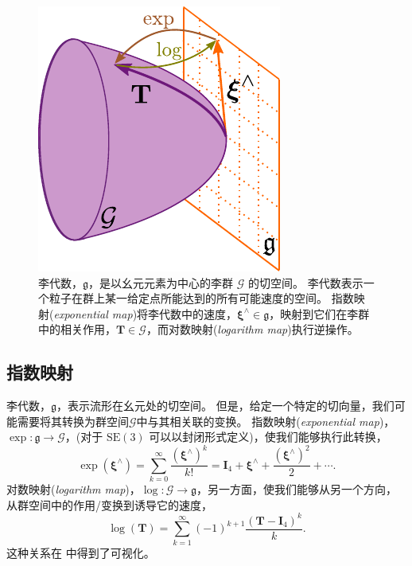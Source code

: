 \begin{figure}[t]
    \centering
    \includegraphics[width=0.7\columnwidth]{figures/lie-group-example.pdf}
    \caption{
    李代数，$\mathfrak{g}$，是以幺元元素为中心的李群 $\mathcal{G}$ 的切空间。 
    李代数表示一个粒子在群上某一给定点所能达到的所有可能速度的空间。 
    指数映射(\textit{exponential map})将李代数中的速度，$\boldsymbol{\xi}^\wedge \in \mathfrak{g}$，映射到它们在李群中的相关作用，$\mathbf{T} \in \mathcal{G}$，而对数映射(\textit{logarithm map})执行逆操作。}
    \label{fig:lie_algebra}
\end{figure}

\subsection{指数映射}

李代数，$\mathfrak{g}$，表示流形在幺元处的切空间。 
但是，给定一个特定的切向量，我们可能需要将其转换为群空间$\mathcal{G}$中与其相关联的变换。 
指数映射(\textit{exponential map})， $\operatorname{exp} : \mathfrak{g} \rightarrow \mathcal{G}$，(对于 $\mathrm{SE}(3)$ 可以以封闭形式定义)，使我们能够执行此转换，
\begin{equation}
    \operatorname{exp}(\boldsymbol{\xi}^\wedge) = \sum^\infty_{k=0} \frac{ (\boldsymbol{\xi}^\wedge)^k }{k!} = \mathbf{I}_4 + \boldsymbol{\xi}^\wedge + \frac{(\boldsymbol{\xi}^\wedge)^2}{2} + \cdots.
\end{equation}
对数映射(\textit{logarithm map})，$\operatorname{log} : \mathcal{G} \rightarrow \mathfrak{g}$，另一方面，使我们能够从另一个方向，从群空间中的作用/变换到诱导它的速度， 
\begin{equation}
    \operatorname{log}(\mathbf{T}) = \sum^\infty_{k=1} (-1)^{k+1} \frac{(\mathbf{T} - \mathbf{I}_4)^k}{k}.
\end{equation}
这种关系在  中得到了可视化。 

